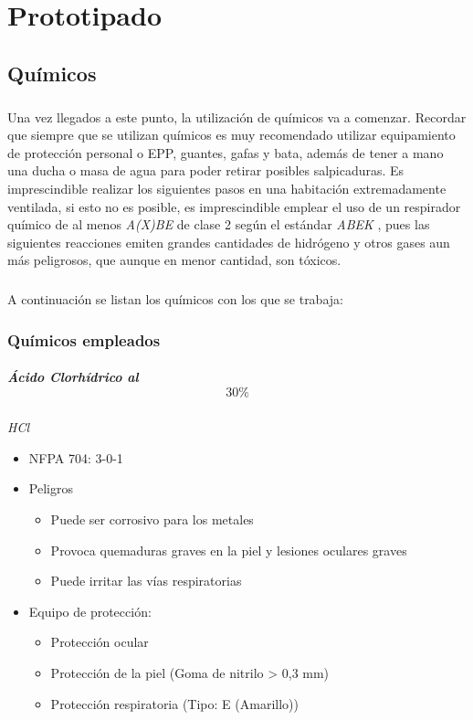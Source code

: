 \chapter{Prototipado}
\label{prototipado}



\section{Químicos}
\paragraph{} Una vez llegados a este punto, la utilización de químicos va a comenzar. Recordar que siempre que se utilizan químicos es muy recomendado utilizar equipamiento de protección personal o EPP, guantes, gafas y bata, además de tener a mano una ducha o masa de agua para poder retirar posibles salpicaduras. Es imprescindible realizar los siguientes pasos en una habitación extremadamente ventilada, si esto no es posible, es imprescindible emplear el uso de un respirador químico de al menos \textit{A(X)BE} de clase 2 según el estándar \textit{ABEK} \cite{abek}, pues las siguientes reacciones emiten grandes cantidades de hidrógeno y otros gases aun más peligrosos, que aunque en menor cantidad, son tóxicos.

\paragraph{} A continuación se listan los químicos con los que se trabaja:

\subsection{Químicos empleados}
\paragraph{Ácido Clorhídrico al $$30\%$$} \textit{HCl} \cite{hcl}
\begin{itemize}
    \item NFPA 704: 3-0-1 \cite{nfpa704}
    \item Peligros
    \begin{itemize}
        \item Puede ser corrosivo para los metales
        \item Provoca quemaduras graves en la piel y lesiones oculares graves
        \item Puede irritar las vías respiratorias
    \end{itemize}
    \item Equipo de protección: 
    \begin{itemize}
        \item Protección ocular
        \item Protección de la piel (Goma de nitrilo > 0,3 mm)
        \item Protección respiratoria (Tipo: E \cite{abek} (Amarillo))
    \end{itemize}
\end{itemize}

